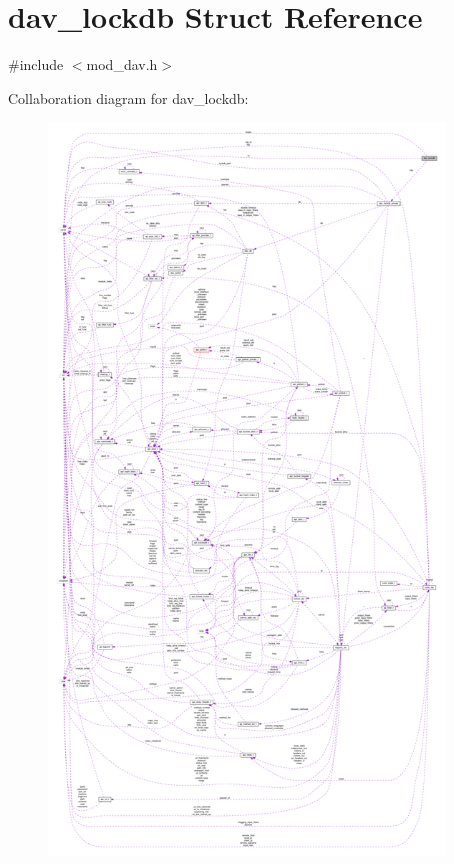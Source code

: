 \hypertarget{structdav__lockdb}{}\section{dav\+\_\+lockdb Struct Reference}
\label{structdav__lockdb}


{\ttfamily \#include $<$mod\+\_\+dav.\+h$>$}



Collaboration diagram for dav\+\_\+lockdb\+:
\nopagebreak
\begin{figure}[H]
\begin{center}
\leavevmode
\includegraphics[height=550pt]{structdav__lockdb__coll__graph}
\end{center}
\end{figure}
